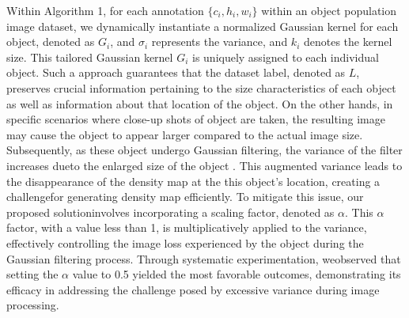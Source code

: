 \documentclass[journal]{IEEEtran}
\begin{document}
Within Algorithm 1, for each annotation $\{c_i,h_i,w_i\}$ within an object population image dataset, we dynamically instantiate a normalized Gaussian kernel for each object, denoted as $G_i$, and $\sigma_i$ represents the variance, and $k_i$ denotes the kernel size. This tailored Gaussian kernel $G_i$ is uniquely assigned to each individual object. Such a approach guarantees that the dataset label, denoted as $L$, preserves crucial information pertaining to the size characteristics of each object as well as information about that location of the object. On the other hands, in specific scenarios where close-up shots of object are taken, the resulting image may cause the object to appear larger compared to the actual image size. Subsequently, as these object undergo Gaussian filtering, the variance of the filter increases dueto the enlarged size of the object . This augmented variance leads to the disappearance of the density map at the this object's location, creating a challengefor generating density map efficiently. To mitigate this issue, our proposed solutioninvolves incorporating a scaling factor, denoted as $\alpha$. This $\alpha$ factor, with a value less than 1, is multiplicatively applied to the variance, effectively controlling the image loss experienced by the object during the Gaussian filtering process. Through systematic experimentation, weobserved that setting the $\alpha$ value to 0.5 yielded the most favorable outcomes, demonstrating its efficacy in addressing the challenge posed by excessive variance during image processing.
\end{document}
